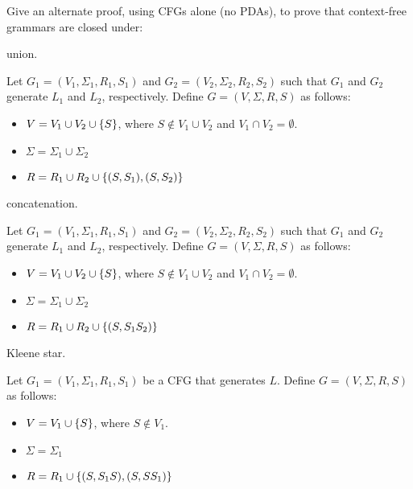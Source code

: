 \begin{problem}
  Give an alternate proof, using CFGs alone (no PDAs),
  to prove that context-free grammars are closed under:
  \begin{enumalph}
    \item union.
    \begin{Answer}
      Let $G_1 = (V_1, \Sigma_1, R_1, S_1)$ and $G_2 = (V_2, \Sigma_2, R_2, S_2)$
      such that $G_1$ and $G_2$ generate $L_1$ and $L_2$, respectively.
      Define $G = (V, \Sigma, R, S)$ as follows:
      \begin{itemize}
        \item $V = V_1 \cup V_2 \cup \left\{S\right\}$, where $S \notin V_1 \cup V_2$ and $V_1 \cap V_2 = \emptyset$.
        \item $\Sigma = \Sigma_1 \cup \Sigma_2$
        \item $R = R_1 \cup R_2 \cup \left\{(S, S_1), (S, S_2)\right\}$
      \end{itemize}
    \end{Answer}
    \item concatenation.
    \begin{Answer}
      Let $G_1 = (V_1, \Sigma_1, R_1, S_1)$ and $G_2 = (V_2, \Sigma_2, R_2, S_2)$
      such that $G_1$ and $G_2$ generate $L_1$ and $L_2$, respectively.
      Define $G = (V, \Sigma, R, S)$ as follows:
      \begin{itemize}
        \item $V = V_1 \cup V_2 \cup \left\{S\right\}$, where $S \notin V_1 \cup V_2$ and $V_1 \cap V_2 = \emptyset$.
        \item $\Sigma = \Sigma_1 \cup \Sigma_2$
        \item $R = R_1 \cup R_2 \cup \left\{(S, S_1S_2)\right\}$
      \end{itemize}
    \end{Answer}
    \item Kleene star.
    \begin{Answer}
      Let $G_1 = (V_1, \Sigma_1, R_1, S_1)$ be a CFG that generates $L$.
      Define $G = (V, \Sigma, R, S)$ as follows:
      \begin{itemize}
        \item $V = V_1 \cup \left\{S\right\}$, where $S \notin V_1$.
        \item $\Sigma = \Sigma_1$
        \item $R = R_1 \cup \left\{(S, S_1S), (S, SS_1)\right\}$
      \end{itemize}
    \end{Answer}
  \end{enumalph}
\end{problem}

